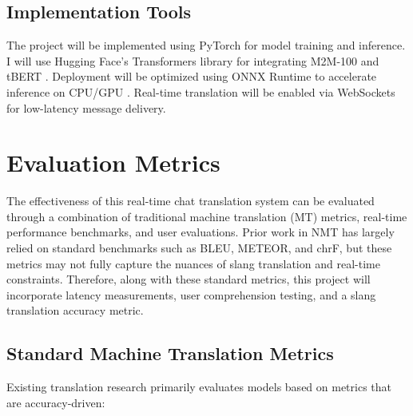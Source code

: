 \documentclass[10pt,twocolumn]{article}
\begin{document}
\subsection{Implementation Tools}

The project will be implemented using PyTorch \cite{PyTorch} for model training and inference. I will use Hugging Face’s Transformers library for integrating M2M-100 and tBERT \cite{HuggingFace}. Deployment will be optimized using ONNX Runtime to accelerate inference on CPU/GPU \cite{ONNX}. Real-time translation will be enabled via WebSockets for low-latency message delivery.

\section{Evaluation Metrics}

The effectiveness of this real-time chat translation system can be evaluated through a combination of traditional machine translation (MT) metrics, real-time performance benchmarks, and user evaluations. Prior work in NMT has largely relied on standard benchmarks such as BLEU, METEOR, and chrF, but these metrics may not fully capture the nuances of slang translation and real-time constraints. Therefore, along with these standard metrics, this project will incorporate latency measurements, user comprehension testing, and a slang translation accuracy metric.

\subsection{Standard Machine Translation Metrics}

Existing translation research primarily evaluates models based on metrics that are accuracy-driven:
\end{document}
